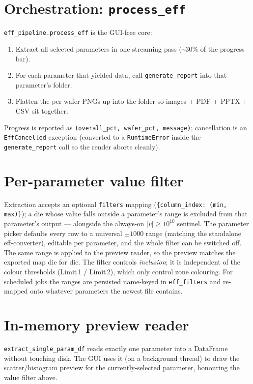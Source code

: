 \documentclass[11pt,a4paper]{report}
\newcommand{\code}[1]{\texttt{#1}}
\begin{document}
\section{Orchestration: \code{process\_eff}}
\code{eff\_pipeline.process\_eff} is the GUI-free core:
\begin{enumerate}[leftmargin=1.6em]
  \item Extract all selected parameters in one streaming pass
        (\textasciitilde30\% of the progress bar).
  \item For each parameter that yielded data, call \code{generate\_report} into
        that parameter's folder.
  \item Flatten the per-wafer PNGs up into the folder so images + PDF + PPTX + CSV
        sit together.
\end{enumerate}
Progress is reported as \code{(overall\_pct, wafer\_pct, message)}; cancellation
is an \code{EffCancelled} exception (converted to a \code{RuntimeError} inside the
\code{generate\_report} call so the render aborts cleanly).

\section{Per-parameter value filter}
Extraction accepts an optional \code{filters} mapping
(\code{\{column\_index: (min, max)\}}); a die whose value falls outside a
parameter's range is excluded from that parameter's output --- alongside the
always-on $|v|\ge 10^{10}$ sentinel. The parameter picker defaults every
row to a universal $\pm1000$ range (matching the standalone eff-converter),
editable per parameter, and the whole filter can be switched off. The same range
is applied to the preview reader, so the preview matches the exported map die for
die. The filter controls \emph{inclusion}; it is independent of the colour
thresholds (Limit\,1 / Limit\,2), which only control zone colouring. For
scheduled jobs the ranges are persisted name-keyed in \code{eff\_filters} and
re-mapped onto whatever parameters the newest file contains.

\section{In-memory preview reader}
\code{extract\_single\_param\_df} reads exactly one parameter into a DataFrame
without touching disk. The GUI uses it (on a background thread) to draw the
scatter/histogram preview for the currently-selected parameter, honouring the
value filter above.
\end{document}
